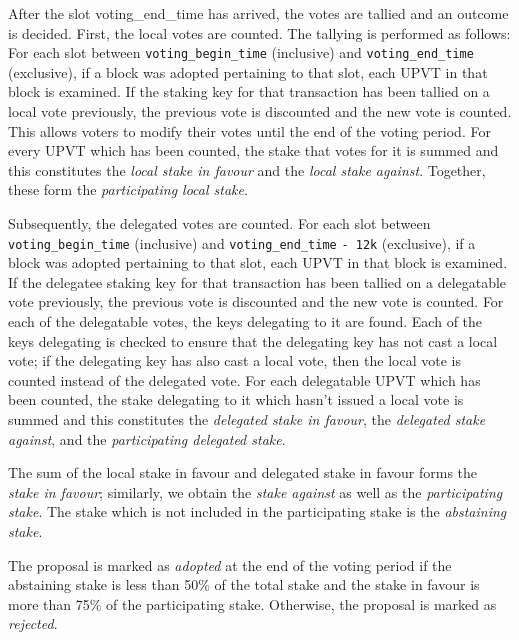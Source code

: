 
After the slot voting\_end\_time has arrived, the votes are tallied and an outcome is decided. First, the local votes are counted. The tallying is performed as follows: For each slot between \verb;voting_begin_time; (inclusive) and \verb;voting_end_time; (exclusive), if a block was adopted pertaining to that slot, each UPVT in that block is examined. If the staking key for that transaction has been tallied on a local vote previously, the previous vote is discounted and the new vote is counted. This allows voters to modify their votes until the end of the voting period. For every UPVT which has been counted, the stake that votes for it is summed and this constitutes the \emph{local stake in favour} and the \emph{local stake against}. Together, these form the \emph{participating local stake}.

Subsequently, the delegated votes are counted. For each slot between \verb;voting_begin_time; (inclusive) and \verb;voting_end_time; \verb;- 12k; (exclusive), if a block was adopted pertaining to that slot, each UPVT in that block is examined. If the delegatee staking key for that transaction has been tallied on a delegatable vote previously, the previous vote is discounted and the new vote is counted. For each of the delegatable votes, the keys delegating to it are found. Each of the keys delegating is checked to ensure that the delegating key has not cast a local vote; if the delegating key has also cast a local vote, then the local vote is counted instead of the delegated vote. For each delegatable UPVT which has been counted, the stake delegating to it which hasn't issued a local vote is summed and this constitutes the \emph{delegated stake in favour}, the \emph{delegated stake against}, and the \emph{participating delegated stake}.

The sum of the local stake in favour and delegated stake in favour forms the \emph{stake in favour}; similarly, we obtain the \emph{stake against} as well as the \emph{participating stake}. The stake which is not included in the participating stake is the \emph{abstaining stake}.

The proposal is marked as \emph{adopted} at the end of the voting period if the abstaining stake is less than 50\% of the total stake and the stake in favour is more than 75\% of the participating stake. Otherwise, the proposal is marked as \emph{rejected}.


